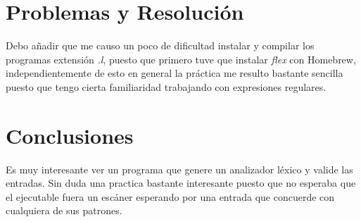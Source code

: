 \section{Problemas y Resolución}

Debo añadir que me causo un poco de dificultad instalar y compilar los programas extensión \textit{.l}, puesto que primero tuve que instalar \textit{flex} con Homebrew, independientemente de esto en general la práctica me resulto bastante sencilla puesto que tengo cierta familiaridad trabajando con expresiones regulares.

\section{Conclusiones}

Es muy interesante ver un programa que genere un analizador léxico y valide las entradas. Sin duda una practica bastante interesante puesto que no esperaba que el ejecutable fuera un escáner esperando por una entrada que concuerde con cualquiera de sus patrones.

\pagebreak